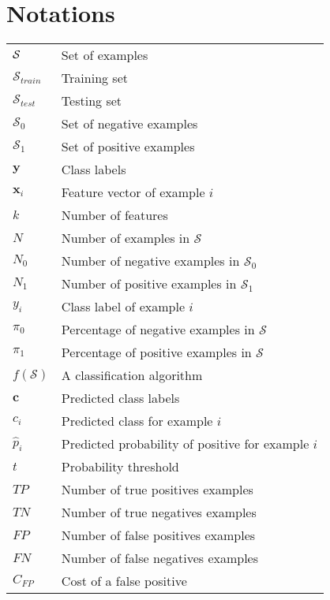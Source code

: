 
\chapter*{Notations}

\begin{tabularx}{\textwidth}{ l X }
$\cal S$ 		& Set of examples \\ 
$\mathcal{S}_{train}$ 	& Training set\\
$\mathcal{S}_{test}$ 	& Testing set \\
$\mathcal{S}_0$  & Set of negative examples \\
$\mathcal{S}_1$  & Set of positive examples \\
$\mathbf{y}$ 		& Class labels  \\  
$\mathbf{x}_i$ 		& Feature vector of example $i$ \\
$k$ 			& Number of features  \\
$N $ 			& Number of examples in $\mathcal{S}$ 	 \\
$N_0 $      & Number of negative examples in $\mathcal{S}_0$    \\
$N_1 $      & Number of positive examples in $\mathcal{S}_1$    \\
$y_i$ 			& Class label of example $i$  \\
$\pi_0$ & Percentage of negative examples in $\mathcal{S}$ \\
$\pi_1$ & Percentage of positive examples in $\mathcal{S}$ \\
$f(\mathcal{S})$ 	& A classification algorithm 	 \\
$\mathbf{c}$ 		& Predicted class labels \\  
$c_i$ 			& Predicted class for example $i$   \\
$\hat p_i$		& Predicted probability of positive for example $i$  \\
$t$ & Probability threshold \\ %
$TP$          & Number of true positives examples \\
$TN$          & Number of true negatives examples \\
$FP$          & Number of false positives examples \\
$FN$          & Number of false negatives examples \\
$C_{FP}$    & Cost of a false positive   \\ 

\end{tabularx}
